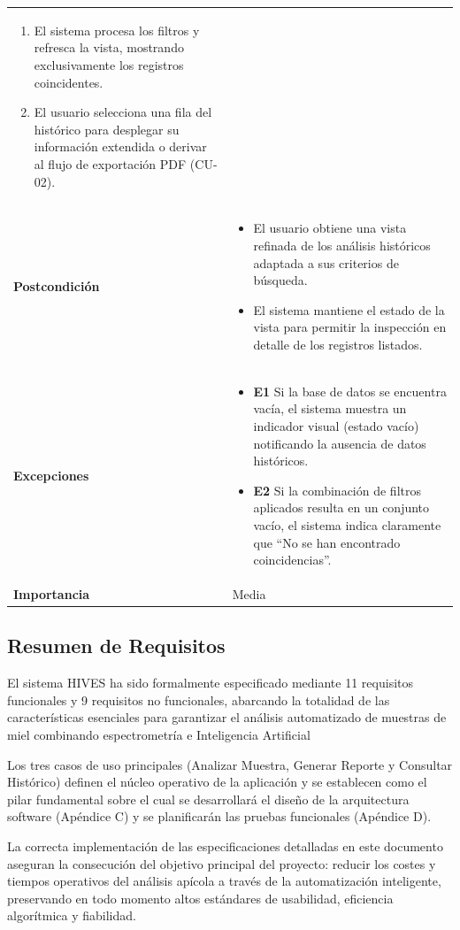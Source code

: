 \begin{center}
\begin{longtable}{ p{} p{} }
\begin{enumerate}
          \item El sistema procesa los filtros y refresca la vista, mostrando exclusivamente los registros coincidentes.
          \item El usuario selecciona una fila del histórico para desplegar su información extendida o derivar al flujo de exportación PDF (CU-02).
        \end{enumerate}\\
      \textbf{Postcondición}        &
        \begin{itemize}
          \tightlist
          \item El usuario obtiene una vista refinada de los análisis históricos adaptada a sus criterios de búsqueda.
          \item El sistema mantiene el estado de la vista para permitir la inspección en detalle de los registros listados.
        \end{itemize}\\
      \textbf{Excepciones}          &
        \begin{itemize}
          \tightlist
          \item \textbf{E1} Si la base de datos se encuentra vacía, el sistema muestra un indicador visual (estado vacío) notificando la ausencia de datos históricos.
          \item \textbf{E2} Si la combinación de filtros aplicados resulta en un conjunto vacío, el sistema indica claramente que ``No se han encontrado coincidencias''.
        \end{itemize}\\
      \textbf{Importancia}          & Media \\
      \bottomrule
    \end{longtable}
\end{center}
\clearpage
\subsection{Resumen de Requisitos}
El sistema HIVES ha sido formalmente especificado mediante 11 requisitos funcionales y 9 requisitos no funcionales, abarcando la totalidad de las características esenciales para garantizar el análisis automatizado de muestras de miel combinando espectrometría e Inteligencia Artificial

Los tres casos de uso principales (Analizar Muestra, Generar Reporte y Consultar Histórico) definen el núcleo operativo de la aplicación y se establecen como el pilar fundamental sobre el cual se desarrollará el diseño de la arquitectura software (Apéndice C) y se planificarán las pruebas funcionales (Apéndice D).

La correcta implementación de las especificaciones detalladas en este documento aseguran la consecución del objetivo principal del proyecto: reducir los costes y tiempos operativos del análisis apícola a través de la automatización inteligente, preservando en todo momento altos estándares de usabilidad, eficiencia algorítmica y fiabilidad.